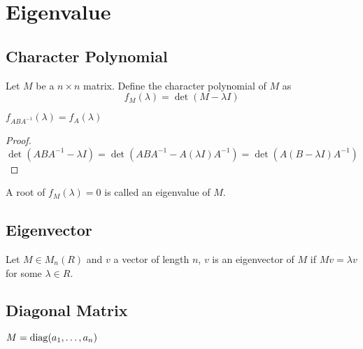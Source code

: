 \section{Eigenvalue}

\subsection{Character Polynomial}
Let $M$ be a $n \times n$ matrix. Define the character polynomial of $M$ as
$$f_M(\lambda) = \det(M - \lambda I)$$

\begin{pro}
    $f_{ABA^{-1}}(\lambda) = f_A(\lambda)$
\end{pro}

\begin{proof}
    $\det(ABA^{-1} - \lambda I) = \det(ABA^{-1} - A(\lambda I)A^{-1}) = \det(A(B - \lambda I)A^{-1})$
\end{proof}

A root of $f_M(\lambda) = 0$ is called an eigenvalue of $M$.

\subsection{Eigenvector}
\begin{defi}
Let $M \in M_n(R)$ and $v$ a vector of length $n$, $v$ is an eigenvector of $M$ if $Mv = \lambda v$ for some $\lambda \in R$.
\end{defi}

\subsection{Diagonal Matrix}
$M = \mathop{\mathrm{diag}}(a_1, \dots, a_n)$
